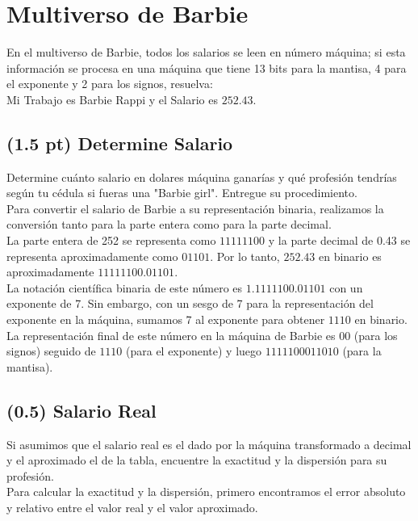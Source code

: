 \section{Multiverso de Barbie}

En el multiverso de Barbie, todos los salarios se leen en número máquina; si esta información se procesa en una máquina que tiene 13 bits para la mantisa, 4 para el exponente y 2 para los signos, resuelva:
\\
Mi Trabajo es Barbie Rappi y el Salario es $252.43$.

\subsection{(1.5 pt) Determine Salario}

Determine cuánto salario en dolares máquina ganarías y qué profesión tendrías según tu cédula si fueras una "Barbie girl". Entregue su procedimiento.
\\

Para convertir el salario de Barbie a su representación binaria, realizamos la conversión tanto para la parte entera como para la parte decimal.
\\

La parte entera de 252 se representa como \(11111100\) y la parte decimal de 0.43 se representa aproximadamente como \(01101\). Por lo tanto, \(252.43\) en binario es aproximadamente \(11111100.01101\).
\\

La notación científica binaria de este número es \(1.1111100.01101\) con un exponente de 7. Sin embargo, con un sesgo de 7 para la representación del exponente en la máquina, sumamos 7 al exponente para obtener \(1110\) en binario.
\\

La representación final de este número en la máquina de Barbie es \(00\) (para los signos) seguido de \(1110\) (para el exponente) y luego \(1111100011010\) (para la mantisa).

\subsection{(0.5) Salario Real}
Si asumimos que el salario real es el dado por la máquina transformado a decimal y el aproximado el de la tabla, encuentre la exactitud y la dispersión para su profesión.
\\

Para calcular la exactitud y la dispersión, primero encontramos el error absoluto y relativo entre el valor real y el valor aproximado.

